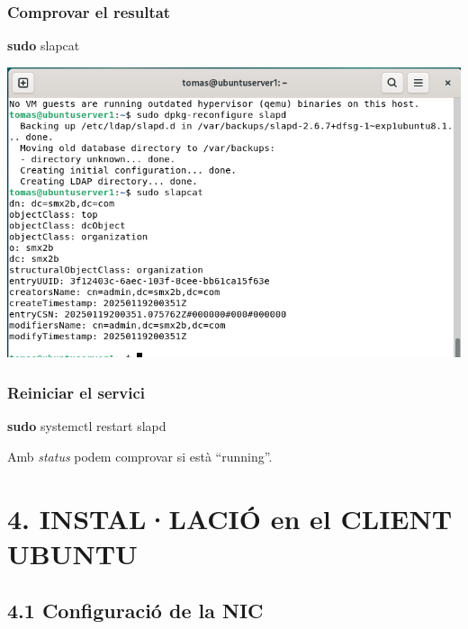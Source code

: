 \documentclass[
  12 pt,
  a4paper,
]{article}
\newenvironment{Shaded}{\begin{snugshade}}{\end{snugshade}}
\newcommand{\FunctionTok}[1]{\textcolor[rgb]{0.13,0.29,0.53}{\textbf{#1}}}
\newcommand{\NormalTok}[1]{#1}
\begin{document}
\subsubsection{Comprovar el resultat}\label{comprovar-el-resultat}

\begin{Shaded}
\begin{Highlighting}[]
\FunctionTok{sudo}\NormalTok{ slapcat}
\end{Highlighting}
\end{Shaded}

\includegraphics{png/slapd4.png}

\subsubsection{Reiniciar el servici}\label{reiniciar-el-servici}

\begin{Shaded}
\begin{Highlighting}[]
\FunctionTok{sudo}\NormalTok{ systemctl restart slapd}
\end{Highlighting}
\end{Shaded}

Amb \emph{status} podem comprovar si està ``running''.

\section{4. INSTAL·LACIÓ en el CLIENT
UBUNTU}\label{installaciuxf3-en-el-client-ubuntu}

\subsection{4.1 Configuració de la NIC}\label{configuraciuxf3-de-la-nic}
\end{document}
